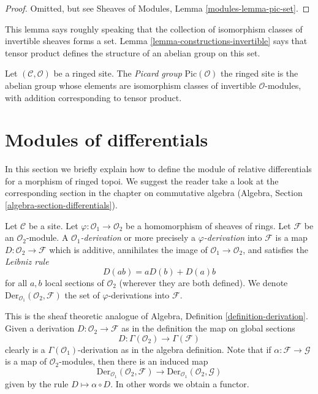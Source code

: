 \begin{proof}
Omitted, but see Sheaves of Modules, Lemma \ref{modules-lemma-pic-set}.
\end{proof}

\noindent
This lemma says roughly speaking that the collection of
isomorphism classes of invertible sheaves forms a set.
Lemma \ref{lemma-constructions-invertible} says that
tensor product defines the structure of an abelian group
on this set.

\begin{definition}
\label{definition-pic}
Let $(\mathcal{C}, \mathcal{O})$ be a ringed site.
The {\it Picard group} $\text{Pic}(\mathcal{O})$
the ringed site is the
abelian group whose elements are isomorphism classes of
invertible $\mathcal{O}$-modules, with addition
corresponding to tensor product.
\end{definition}









\section{Modules of differentials}
\label{section-differentials}

\noindent
In this section we briefly explain how to define the module of relative
differentials for a morphism of ringed topoi.
We suggest the reader take a look at the corresponding section
in the chapter on commutative algebra
(Algebra, Section \ref{algebra-section-differentials}).

\begin{definition}
\label{definition-derivation}
Let $\mathcal{C}$ be a site. Let $\varphi : \mathcal{O}_1 \to \mathcal{O}_2$
be a homomorphism of sheaves of rings. Let $\mathcal{F}$
be an $\mathcal{O}_2$-module. A {\it $\mathcal{O}_1$-derivation}
or more precisely a {\it $\varphi$-derivation} into $\mathcal{F}$
is a map $D : \mathcal{O}_2 \to \mathcal{F}$ which is additive, annihilates
the image of $\mathcal{O}_1 \to \mathcal{O}_2$, and satisfies the
{\it Leibniz rule}
$$
D(ab) = aD(b) + D(a)b
$$
for all $a, b$ local sections of $\mathcal{O}_2$
(wherever they are both defined). We denote
$\text{Der}_{\mathcal{O}_1}(\mathcal{O}_2, \mathcal{F})$
the set of $\varphi$-derivations into $\mathcal{F}$.
\end{definition}

\noindent
This is the sheaf theoretic analogue of
Algebra, Definition \ref{definition-derivation}.
Given a derivation $D : \mathcal{O}_2 \to \mathcal{F}$
as in the definition the map on global sections
$$
D : \Gamma(\mathcal{O}_2) \longrightarrow \Gamma(\mathcal{F})
$$
clearly is a $\Gamma(\mathcal{O}_1)$-derivation as in
the algebra definition. Note that if $\alpha : \mathcal{F} \to \mathcal{G}$
is a map of $\mathcal{O}_2$-modules, then there is an induced map
$$
\text{Der}_{\mathcal{O}_1}(\mathcal{O}_2, \mathcal{F})
\longrightarrow
\text{Der}_{\mathcal{O}_1}(\mathcal{O}_2, \mathcal{G})
$$
given by the rule $D \mapsto \alpha \circ D$. In other words
we obtain a functor.

